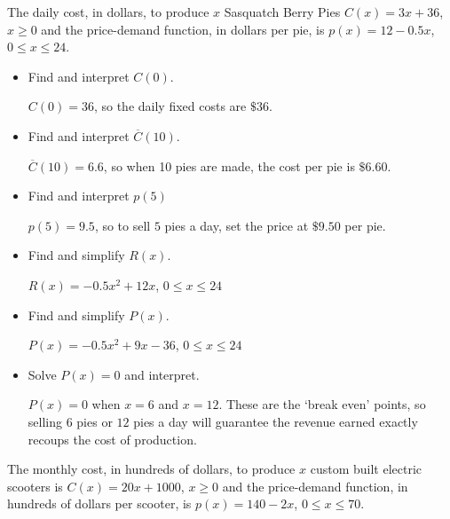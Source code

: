 \documentclass{ximera}
\begin{document}
\begin{question}
\begin{problem}
The daily cost, in dollars, to produce $x$ Sasquatch Berry Pies $C(x) = 3x + 36$, $x \geq 0$ and the price-demand function, in  dollars per pie,  is $p(x) = 12-0.5x$, $0 \leq x \leq 24$.

\begin{itemize}

\item  Find and interpret $C(0)$.

\begin{solution}
    $C(0) = 36$, so the daily fixed costs are $\$36$.
\end{solution}
\item  Find and interpret $\overline{C}(10)$.

\begin{solution}
    $\overline{C}(10) = 6.6$, so when 10 pies are made, the cost per pie is $\$6.60$.
\end{solution}
\item  Find and interpret $p(5)$

\begin{solution}
    $p(5) = 9.5$, so to sell $5$ pies a day, set the price at $\$9.50$  per pie.
\end{solution}
\item  Find and simplify $R(x)$.
\begin{solution}
    $R(x) = -0.5 x^2 + 12x$, $0 \leq x \leq 24$
\end{solution}
\item  Find and simplify $P(x)$.

\begin{solution}
    $P(x) = -0.5 x^2+9x-36$, $0 \leq x \leq 24$
\end{solution}
\item  Solve $P(x) = 0$ and interpret.

\begin{solution}
    $P(x) = 0$ when $x = 6$ and $x=12$.  These are the `break even' points, so selling $6$ pies or $12$ pies a day will guarantee the revenue earned exactly recoups the cost of production.
\end{solution}
\end{itemize}
\end{problem} 

\begin{problem}\label{econexerlast}
The monthly cost, in hundreds of dollars, to produce $x$ custom built electric scooters is $C(x) = 20x + 1000$, $x \geq 0$ and the price-demand function, in  hundreds of dollars per scooter,  is $p(x) = 140-2x$, $0 \leq x \leq 70$.


\end{problem}
\end{question}
\end{document}
